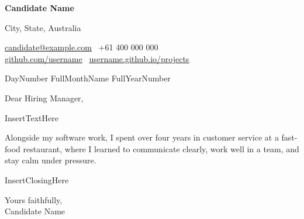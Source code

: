 \documentclass[12pt,a4paper]{article}
\newcommand{\documentlink}[2]{\href{#1}{\underline{#2}}}
\begin{document}
{\LARGE \textbf{Candidate Name}}

City, State, Australia

\documentlink{mailto:candidate@example.com}{candidate@example.com} \textbar\ +61 400 000 000 \\
\documentlink{https://github.com/username}{github.com/username} \textbar\ \documentlink{https://username.github.io/projects/}{username.github.io/projects}

DayNumber FullMonthName FullYearNumber

\setlength{\parskip}{1.2em}

Dear Hiring Manager,

InsertTextHere

Alongside my software work, I spent over four years in customer service at a fast-food restaurant, where I learned to communicate clearly, work well in a team, and stay calm under pressure.

InsertClosingHere

Yours faithfully, \\
Candidate Name
\end{document}

